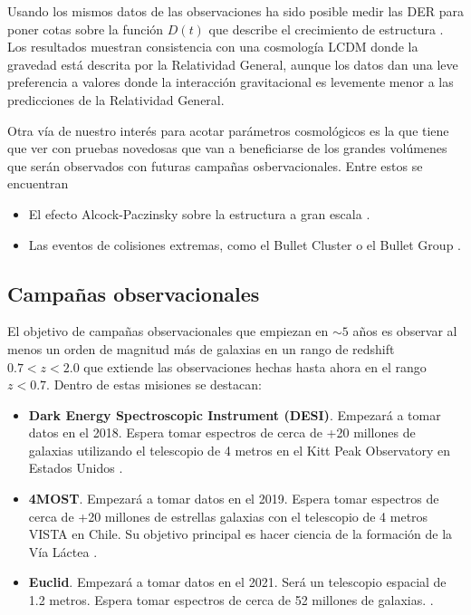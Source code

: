 Usando los mismos datos de las observaciones ha sido posible
medir las DER para poner cotas sobre la funci\'on $D(t)$ que describe
el crecimiento de estructura \cite{2014MNRAS.439.3504S}. Los
resultados muestran consistencia con una cosmolog\'ia LCDM donde la
gravedad est\'a descrita por la Relatividad General, aunque los datos
dan una leve preferencia a valores donde la interacci\'on
gravitacional es levemente menor a las predicciones de la Relatividad
General. 

Otra v\'ia de nuestro inter\'es para acotar par\'ametros
cosmol\'ogicos es la que tiene que ver con pruebas novedosas que van a
beneficiarse de los grandes vol\'umenes que ser\'an observados con
futuras campa\~nas osbervacionales. Entre estos se encuentran

\begin{itemize}
\item El efecto Alcock-Paczinsky sobre la estructura a gran escala \cite{2013arXiv1309.1162S}.
\item Las eventos de colisiones extremas, como el Bullet Cluster o el
  Bullet Group \cite{Bullets2010, Bullets2014}. 
\end{itemize}



\subsection{Campa\~nas observacionales}

El objetivo de campa\~nas observacionales que empiezan en $\sim 5$
a\~nos es observar al menos un orden de magnitud m\'as de galaxias en
un rango de redshift $0.7<z<2.0$ que extiende las observaciones hechas
hasta ahora en el rango $z<0.7$. Dentro de estas misiones se destacan:

\begin{itemize}
\item {\bf Dark Energy Spectroscopic Instrument (DESI)}. Empezar\'a a
  tomar datos en el 2018. Espera tomar espectros de cerca de +20 millones de
  galaxias utilizando el telescopio de 4 metros en el Kitt Peak
  Observatory en Estados Unidos \cite{DESI}.
\item {\bf 4MOST}. Empezar\'a a tomar datos en el 2019. Espera
  tomar espectros de cerca de +20 millones de estrellas galaxias con el
  telescopio de 4 metros VISTA en Chile. Su objetivo principal es
  hacer ciencia de la formaci\'on de la V\'ia L\'actea \cite{4MOST}.
\item {\bf Euclid}. Empezar\'a a tomar datos en el 2021. Ser\'a un
  telescopio espacial de 1.2 metros. Espera tomar espectros de cerca
  de 52 millones de galaxias. \cite{EUCLID}.
\end{itemize}

